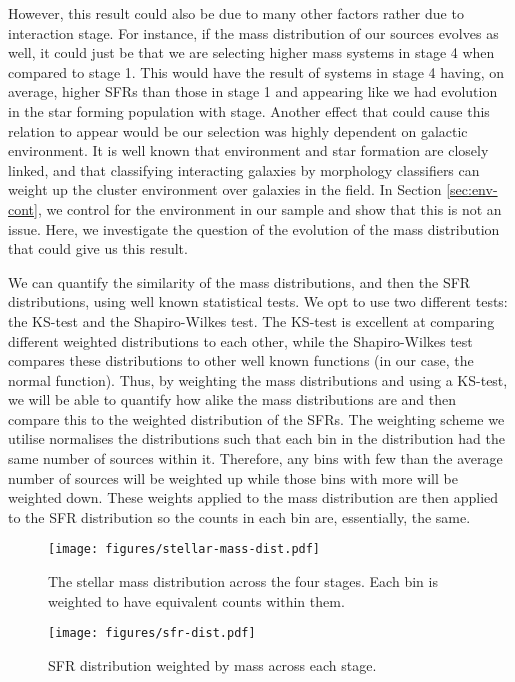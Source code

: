 \documentclass[fleqn,usenatbib]{mnras}
\begin{document}
However, this result could also be due to many other factors rather due to interaction stage. For instance, if the mass distribution of our sources evolves as well, it could just be that we are selecting higher mass systems in stage 4 when compared to stage 1. This would have the result of systems in stage 4 having, on average, higher SFRs than those in stage 1 and appearing like we had evolution in the star forming population with stage. Another effect that could cause this relation to appear would be our selection was highly dependent on galactic environment. It is well known that environment and star formation are closely linked, and that classifying interacting galaxies by morphology classifiers can weight up the cluster environment over galaxies in the field. In Section \ref{sec:env-cont}, we control for the environment in our sample and show that this is not an issue. Here, we investigate the question of the evolution of the mass distribution that could give us this result.

We can quantify the similarity of the mass distributions, and then the SFR distributions, using well known statistical tests. We opt to use two different tests: the KS-test and the Shapiro-Wilkes test. The KS-test is excellent at comparing different weighted distributions to each other, while the Shapiro-Wilkes test compares these distributions to other well known functions (in our case, the normal function). Thus, by weighting the mass distributions and using a KS-test, we will be able to quantify how alike the mass distributions are and then compare this to the weighted distribution of the SFRs. The weighting scheme we utilise normalises the distributions such that each bin in the distribution had the same number of sources within it. Therefore, any bins with few than the average number of sources will be weighted up while those bins with more will be weighted down. These weights applied to the mass distribution are then applied to the SFR distribution so the counts in each bin are, essentially, the same.

\begin{figure}
    \centering
    \texttt{[image: figures/stellar-mass-dist.pdf]}
    \caption{The stellar mass distribution across the four stages. Each bin is weighted to have equivalent counts within them.}
    \label{fig:weighted-mass}
\end{figure}

\begin{figure}
    \centering
    \texttt{[image: figures/sfr-dist.pdf]}
    \caption{SFR distribution weighted by mass across each stage.}
    \label{fig:weighted-sfr}
\end{figure}
\end{document}
